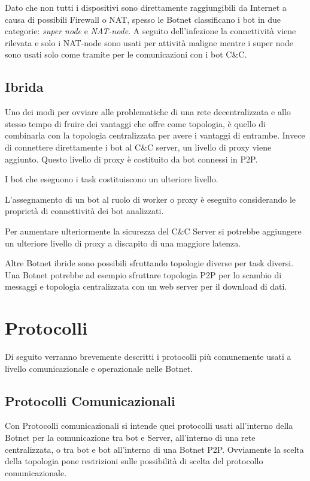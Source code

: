 Dato che non tutti i dispositivi sono direttamente raggiungibili da Internet a causa di possibili Firewall o NAT, spesso le Botnet classificano i bot in due categorie: \textit{super node} e \textit{NAT-node}.
A seguito dell'infezione la connettività viene rilevata e solo i NAT-node sono usati per attività maligne mentre i super node sono usati solo come tramite per le comunicazioni con i bot C\&C.

\subsection{Ibrida}
Uno dei modi per ovviare alle problematiche di una rete decentralizzata e allo stesso tempo di fruire dei vantaggi che offre come topologia, è quello di combinarla con la topologia centralizzata per avere i vantaggi di entrambe.
Invece di connettere direttamente i bot al C\&C server, un livello di proxy viene aggiunto. Questo livello di proxy è costituito da bot connessi in P2P. 

I bot che eseguono i task costituiscono un ulteriore livello. 

L'assegnamento di un bot al ruolo di worker o proxy è eseguito considerando le proprietà di connettività dei bot analizzati.

Per aumentare ulteriormente la sicurezza del C\&C Server si potrebbe aggiungere un ulteriore livello di proxy a discapito di una maggiore latenza.

Altre  Botnet ibride sono possibili sfruttando topologie diverse per task diversi. Una Botnet potrebbe ad esempio sfruttare topologia P2P per lo scambio di messaggi e topologia centralizzata con un web server per il download di dati.

\section{Protocolli}
Di seguito verranno brevemente descritti i protocolli più comunemente usati a livello comunicazionale e operazionale nelle Botnet. 
\subsection{Protocolli Comunicazionali}
Con Protocolli comunicazionali si intende quei protocolli usati all'interno della Botnet per la comunicazione tra bot e Server, all'interno di una rete centralizzata, o tra bot e bot all'interno di una Botnet P2P.
Ovviamente la scelta della topologia pone restrizioni sulle possibilità di scelta del protocollo comunicazionale.

